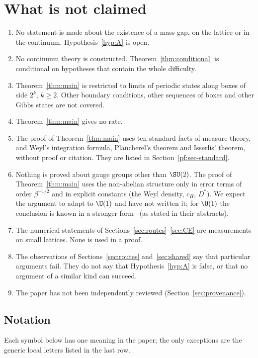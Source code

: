 \tableofcontents

\section{What is not claimed}\label{sec:notclaimed}

\begin{enumerate}
\item No statement is made about the existence of a mass gap, on the lattice or in the continuum. Hypothesis~\ref{hyp:A} is open.
\item No continuum theory is constructed. Theorem~\ref{thm:conditional} is conditional on hypotheses that contain the whole difficulty.
\item Theorem~\ref{thm:main} is restricted to limits of periodic states along boxes of side $2^k$, $k\ge2$. Other boundary conditions, other sequences of boxes and other Gibbs states are not covered.
\item Theorem~\ref{thm:main} gives no rate.
\item The proof of Theorem~\ref{thm:main} uses ten standard facts of measure theory, and Weyl's integration formula, Plancherel's theorem and Isserlis' theorem, without proof or citation. They are listed in Section~\ref{pf:sec-standard}.
\item Nothing is proved about gauge groups other than $\SU(2)$. The proof of Theorem~\ref{thm:main} uses the non-abelian structure only in error terms of order $\beta^{-1/2}$ and in explicit constants (the Weyl density, $c_H$, $D^*$). We expect the argument to adapt to $\U(1)$ and have not written it; for $\U(1)$ the conclusion is known in a stronger form~\cite{Guth80,FS82} (as stated in their abstracts).
\item The numerical statements of Sections~\ref{sec:routes}--\ref{sec:CE} are measurements on small lattices. None is used in a proof.
\item The observations of Sections~\ref{sec:routes} and~\ref{sec:shared} say that particular arguments fail. They do not say that Hypothesis~\ref{hyp:A} is false, or that no argument of a similar kind can succeed.
\item The paper has not been independently reviewed (Section~\ref{sec:provenance}).
\end{enumerate}

\subsection*{Notation}
Each symbol below has one meaning in the paper; the only exceptions are the generic local letters listed in the last row.

